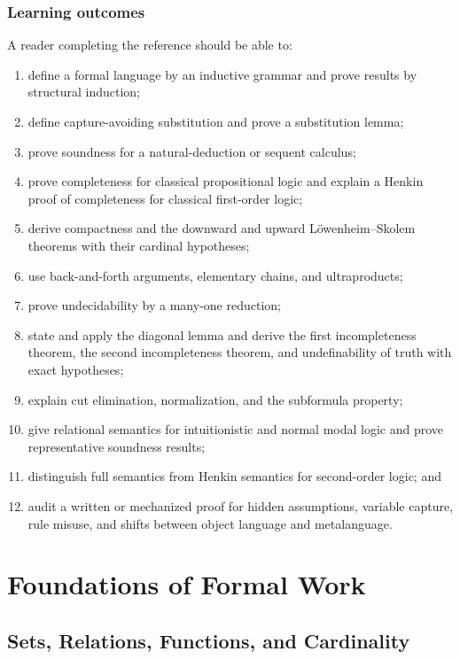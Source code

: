 \documentclass[11pt,oneside,openany]{book}
\theoremstyle{definition}
\theoremstyle{plain}
\theoremstyle{remark}
\begin{document}
\section*{Learning outcomes}

A reader completing the reference should be able to:
\begin{enumerate}
  \item define a formal language by an inductive grammar and prove results by
        structural induction;
  \item define capture-avoiding substitution and prove a substitution lemma;
  \item prove soundness for a natural-deduction or sequent calculus;
  \item prove completeness for classical propositional logic and explain a
        Henkin proof of completeness for classical first-order logic;
  \item derive compactness and the downward and upward L\"owenheim--Skolem
        theorems with their cardinal hypotheses;
  \item use back-and-forth arguments, elementary chains, and ultraproducts;
  \item prove undecidability by a many-one reduction;
  \item state and apply the diagonal lemma and derive the first incompleteness
        theorem, the second incompleteness theorem, and undefinability of truth
        with exact hypotheses;
  \item explain cut elimination, normalization, and the subformula property;
  \item give relational semantics for intuitionistic and normal modal logic and
        prove representative soundness results;
  \item distinguish full semantics from Henkin semantics for second-order logic;
        and
  \item audit a written or mechanized proof for hidden assumptions, variable
        capture, rule misuse, and shifts between object language and
        metalanguage.
\end{enumerate}

\tableofcontents

\mainmatter

\part{Foundations of Formal Work}

\chapter{Sets, Relations, Functions, and Cardinality}
\label{ch:set-prerequisites}
\end{document}
